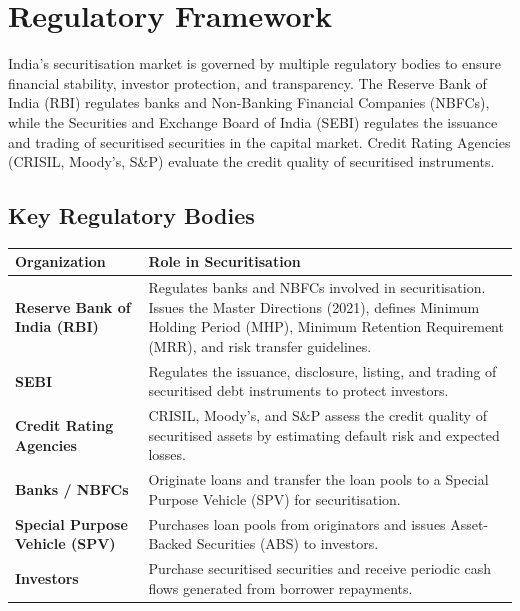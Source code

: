 
\section{Regulatory Framework}

India's securitisation market is governed by multiple regulatory bodies to ensure financial stability, investor protection, and transparency. The Reserve Bank of India (RBI) regulates banks and Non-Banking Financial Companies (NBFCs), while the Securities and Exchange Board of India (SEBI) regulates the issuance and trading of securitised securities in the capital market. Credit Rating Agencies (CRISIL, Moody's, S\&P) evaluate the credit quality of securitised instruments.

\vspace{0.4cm}

\subsection*{Key Regulatory Bodies}

\renewcommand{\arraystretch}{1.5}

\begin{tabularx}{\textwidth}{|p{3.5cm}|X|}
	\hline
	\rowcolor{TableHeader}
	\textbf{Organization} & \textbf{Role in Securitisation} \\
	\hline
	
	\textbf{Reserve Bank of India (RBI)}
	&
	Regulates banks and NBFCs involved in securitisation. Issues the Master Directions (2021), defines Minimum Holding Period (MHP), Minimum Retention Requirement (MRR), and risk transfer guidelines.
	\\
	\hline
	
	\textbf{SEBI}
	&
	Regulates the issuance, disclosure, listing, and trading of securitised debt instruments to protect investors.
	\\
	\hline
	
	\textbf{Credit Rating Agencies}
	&
	CRISIL, Moody's, and S\&P assess the credit quality of securitised assets by estimating default risk and expected losses.
	\\
	\hline
	
	\textbf{Banks / NBFCs}
	&
	Originate loans and transfer the loan pools to a Special Purpose Vehicle (SPV) for securitisation.
	\\
	\hline
	
	\textbf{Special Purpose Vehicle (SPV)}
	&
	Purchases loan pools from originators and issues Asset-Backed Securities (ABS) to investors.
	\\
	\hline
	
	\textbf{Investors}
	&
	Purchase securitised securities and receive periodic cash flows generated from borrower repayments.
	\\
	\hline
	
\end{tabularx}

